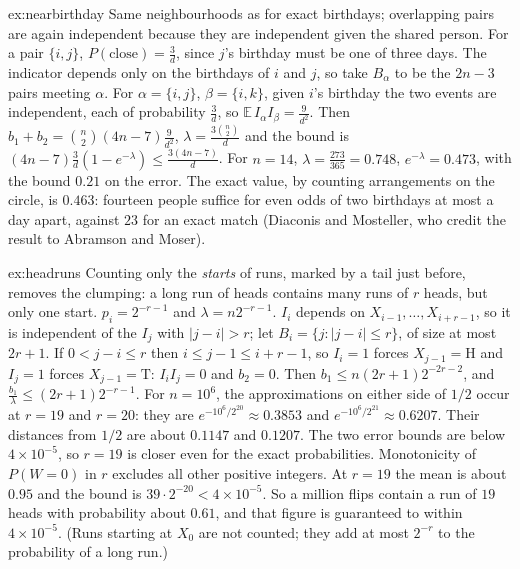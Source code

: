 \begin{solution}{ex:nearbirthday}
\idea Same neighbourhoods as for exact birthdays; overlapping pairs are again independent because they are independent given the shared person.
\writeup For a pair $\{i,j\}$, $P(\text{close})=\frac3d$, since $j$'s birthday must be one of three days. The indicator depends only on the birthdays of $i$ and $j$, so take
$B_\alpha$ to be the $2n-3$ pairs meeting $\alpha$. For $\alpha=\{i,j\}$, $\beta=\{i,k\}$, given $i$'s birthday the two events are independent, each of probability $\frac3d$,
so $\mathbb E\,I_\alpha I_\beta=\frac9{d^2}$. Then $b_1+b_2=\binom n2(4n-7)\frac9{d^2}$, $\lambda=\frac{3\binom n2}d$ and the bound is $(4n-7)\frac3d(1-e^{-\lambda})\le\frac{3(4n-7)}d$.
For $n=14$, $\lambda=\frac{273}{365}=0.748$, $e^{-\lambda}=0.473$, with the bound $0.21$ on the error. The exact value, by counting arrangements on the circle, is
$0.463$: fourteen people suffice for even odds of two birthdays at most a day apart, against $23$ for an exact match (Diaconis and Mosteller, who credit the
result to Abramson and Moser).
\end{solution}

\begin{solution}{ex:headruns}
\idea Counting only the \emph{starts} of runs, marked by a tail just before, removes the clumping: a long run of heads contains many runs of $r$ heads, but only
one start.
\writeup $p_i=2^{-r-1}$ and $\lambda=n2^{-r-1}$. $I_i$ depends on $X_{i-1},\dots,X_{i+r-1}$, so it is independent of the $I_j$ with $|j-i|>r$; let $B_i=\{j:|j-i|\le r\}$,
of size at most $2r+1$. If $0<j-i\le r$ then $i\le j-1\le i+r-1$, so $I_i=1$ forces $X_{j-1}=\mathrm H$ and $I_j=1$ forces $X_{j-1}=\mathrm T$: $I_iI_j=0$ and $b_2=0$.
Then $b_1\le n(2r+1)2^{-2r-2}$, and $\frac{b_1}\lambda\le(2r+1)2^{-r-1}$. For $n=10^6$, the approximations on either side of $1/2$ occur at $r=19$ and $r=20$: they are $e^{-10^6/2^{20}}\approx0.3853$ and $e^{-10^6/2^{21}}\approx0.6207$. Their distances from $1/2$ are about $0.1147$ and $0.1207$. The two error bounds are below $4\times10^{-5}$, so $r=19$ is closer even for the exact probabilities. Monotonicity of $P(W=0)$ in $r$ excludes all other positive integers. At $r=19$ the mean is about $0.95$ and the bound is $39\cdot2^{-20}<4\times10^{-5}$.
So a million flips contain a run of $19$ heads with probability about $0.61$, and that figure is guaranteed to within $4\times10^{-5}$.
(Runs starting at $X_0$ are not counted; they add at most $2^{-r}$ to the probability of a long run.)
\end{solution}

